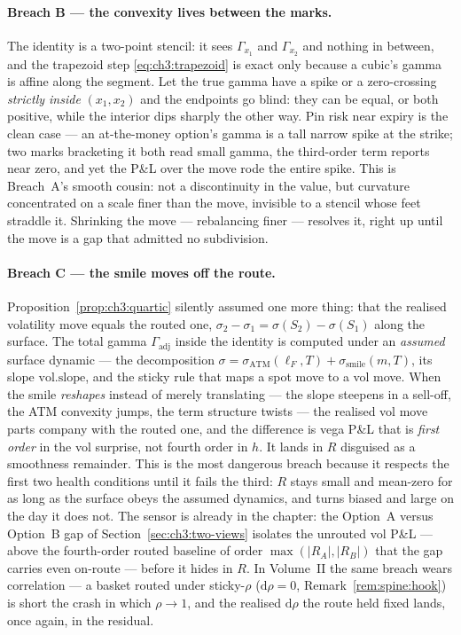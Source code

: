 \documentclass[11pt]{book}
\theoremstyle{plain}
\theoremstyle{definition}
\theoremstyle{remark}
\newcommand{\mln}{m}                             %
\newcommand{\lF}{\ell_F}                         %
\newcommand{\ssm}{\sigma_{\mathrm{smile}}}       %
\newcommand{\satm}{\sigma_{\mathrm{ATM}}}        %
\newcommand{\volslope}{\mathrm{vol.slope}}       %
\newcommand{\Gadj}{\Gamma_{\mathrm{adj}}}        %
\newcommand{\stickyrho}{\textnormal{sticky-}\ensuremath{\rho}} %
\newcommand{\dd}{\mathrm{d}}                                  %
\begin{document}
\paragraph{Breach B --- the convexity lives between the marks.}
The identity is a two-point stencil: it sees $\Gamma_{x_1}$ and $\Gamma_{x_2}$
and nothing in between, and the trapezoid step
\eqref{eq:ch3:trapezoid} is exact only because a cubic's gamma is affine along
the segment. Let the true gamma have a spike or a zero-crossing \emph{strictly
inside} $(x_1, x_2)$ and the endpoints go blind: they can be equal, or both
positive, while the interior dips sharply the other way. Pin risk near expiry
is the clean case --- an at-the-money option's gamma is a tall narrow spike at
the strike; two marks bracketing it both read small gamma, the third-order term
reports near zero, and yet the P\&L over the move rode the entire spike. This
is Breach~A's smooth cousin: not a discontinuity in the value, but curvature
concentrated on a scale finer than the move, invisible to a stencil whose feet
straddle it. Shrinking the move --- rebalancing finer --- resolves it, right up
until the move is a gap that admitted no subdivision.

\paragraph{Breach C --- the smile moves off the route.}
Proposition~\ref{prop:ch3:quartic} silently assumed one more thing: that the
realised volatility move equals the routed one,
$\sigma_2 - \sigma_1 = \sigma(S_2) - \sigma(S_1)$ along the surface. The total
gamma $\Gadj$ inside the identity is computed under an \emph{assumed} surface
dynamic --- the decomposition $\sigma = \satm(\lF,T) + \ssm(\mln,T)$, its slope
$\volslope$, and the sticky rule that maps a spot move to a vol move. When the
smile \emph{reshapes} instead of merely translating --- the slope steepens in a
sell-off, the ATM convexity jumps, the term structure twists --- the realised
vol move parts company with the routed one, and the difference is vega P\&L that
is \emph{first order} in the vol surprise, not fourth order in $h$. It lands in
$R$ disguised as a smoothness remainder. This is the most dangerous
breach because it respects the first two health conditions until it fails the
third: $R$ stays small and mean-zero for as long as the surface obeys the
assumed dynamics, and turns biased and large on the day it does not.
The sensor is already in the chapter: the Option~A versus
Option~B gap of Section~\ref{sec:ch3:two-views} isolates the unrouted vol P\&L
--- above the fourth-order routed baseline of order $\max(|R_A|,|R_B|)$ that
the gap carries even on-route --- before it hides in $R$. In Volume~II the same breach wears correlation ---
a basket routed under \stickyrho{} ($\dd\rho = 0$,
Remark~\ref{rem:spine:hook}) is short the crash in which $\rho \to 1$, and the
realised $\dd\rho$ the route held fixed lands, once again, in the residual.
\end{document}

